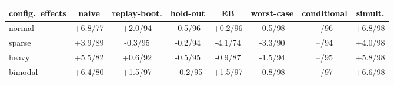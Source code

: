 \begin{tabular}{lccccccc}
\toprule
 config.\ effects & naive & replay-boot. & hold-out & EB & worst-case & conditional & simult. \\
\midrule
normal & +6.8/77 & +2.0/94 & -0.5/96 & +0.2/96 & -0.5/98 & --/96 & +6.8/98 \\
sparse & +3.9/89 & -0.3/95 & -0.2/94 & -4.1/74 & -3.3/90 & --/94 & +4.0/98 \\
heavy & +5.5/82 & +0.6/92 & -0.5/95 & -0.9/87 & -1.5/94 & --/95 & +5.8/98 \\
bimodal & +6.4/80 & +1.5/97 & +0.2/95 & +1.5/97 & -0.8/98 & --/97 & +6.6/98 \\
\bottomrule
\end{tabular}
